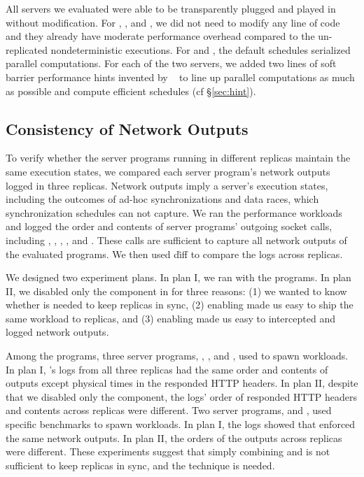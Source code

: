 All \nprog servers we evaluated were able to be transparently plugged and 
played in \xxx without modification. For \clamav, \mediatomb, and \mysql, we 
did not need to modify any line of code and they already have moderate 
performance overhead compared to the un-replicated nondeterministic executions. 
For \apache and \mongoose, the default schedules serialized parallel 
computations. For each of the two servers, we added two lines of soft barrier 
performance hints invented by \parrot~\cite{parrot:sosp13} to line up parallel 
computations as much as possible and compute efficient \dmt schedules (cf 
\S\ref{sec:hint}).

\subsection{Consistency of Network Outputs} \label{sec:correctness}

To verify whether the server programs running in different replicas maintain 
the same execution states, we compared each server program's network outputs 
logged in three replicas. Network outputs imply a server's execution states, 
including the outcomes of ad-hoc synchronizations and data races, which 
synchronization schedules can not capture. We ran the performance workloads and 
logged the order and contents of server programs' outgoing socket calls, 
including \send, \sendto, \sendmsg, \mywrite, and \pwrite. These calls are 
sufficient to capture all network outputs of the evaluated programs. We then 
used \v{diff} to compare the logs across replicas. 

We designed two experiment plans. In plan I, we ran \xxx with the 
programs. In plan II, we disabled only the \timealgo component in \xxx for 
three reasons: (1) we wanted to know whether \timealgo is needed to keep 
replicas in sync, (2) enabling \paxos made us easy to ship the same workload 
to replicas, and (3) enabling \parrot made us easy to intercepted and logged 
network outputs.

Among the \nprog programs, three server programs, \apache, \mediatomb, 
and \mongoose, used \ab to spawn workloads. In plan I, \xxx's logs from all 
three replicas had the same order and contents of outputs except physical 
times in the responded HTTP headers. In plan II, despite that we disabled only
the \timealgo component, the logs' order of responded HTTP headers and contents 
across replicas were different. Two server programs, \clamav and \mysql, 
used specific benchmarks to spawn workloads. In plan I, the logs showed that 
\xxx enforced the same network outputs. In plan II, the orders of the outputs 
across replicas were different. These experiments suggest that simply combining 
\paxos and \dmt is not sufficient to keep replicas in sync, and the \timealgo 
technique is needed.

